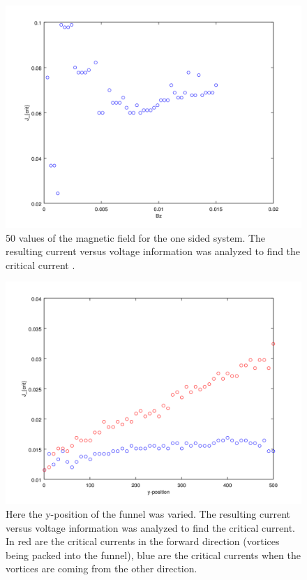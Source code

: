 \begin{figure}[htbp]
\begin{center}
\includegraphics[scale=.50]{oneSideBz.png}
\caption{ 50 values of the magnetic field for the one sided system. The resulting current versus voltage information was analyzed to find the critical current .  }
\label{oneBz}
\end{center}
\end{figure}

\begin{figure}[htbp]
\begin{center}
\includegraphics[scale=.50]{ratchetResolution.png}
\caption{ Here the y-position of the funnel was varied. The resulting current versus voltage information was analyzed to find the critical current. In red are the critical currents in the forward direction (vortices being packed into the funnel), blue are the critical currents when the vortices are coming from the other direction.   }
\label{ratchet}
\end{center}
\end{figure}


